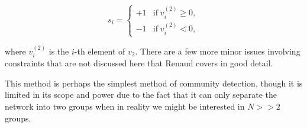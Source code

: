 $$ s_i = \begin{cases}
    +1 & \text{if} \; v_i^{(2)} \geq 0, \\
    -1 & \text{if} \; v_i^{(2)} < 0,
\end{cases} $$

where $v_i^{(2)}$ is the $i$-th element of $v_2$. There are a few more minor issues involving constraints that are not discussed here that Renaud covers in good detail.\cite[27]{oxford:renaud_notes}

This method is perhaps the simplest method of community detection, though it is limited in its scope and power due to the fact that it can only separate the network into two groups when in reality we might be interested in $N >> 2$ groups.

%
%
%
